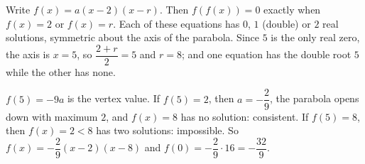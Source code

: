 Write $f(x)=a(x-2)(x-r)$. Then $f(f(x))=0$ exactly when $f(x)=2$ or $f(x)=r$. Each of these equations has $0$, $1$ (double) or $2$ real solutions, symmetric about the axis of the parabola. Since $5$ is the only real zero, the axis is $x=5$, so $\dfrac{2+r}{2}=5$ and $r=8$; and one equation has the double root $5$ while the other has none.

$f(5)=-9a$ is the vertex value. If $f(5)=2$, then $a=-\dfrac{2}{9}$, the parabola opens down with maximum $2$, and $f(x)=8$ has no solution: consistent. If $f(5)=8$, then $f(x)=2<8$ has two solutions: impossible. So $f(x)=-\dfrac{2}{9}(x-2)(x-8)$ and $f(0)=-\dfrac{2}{9}\cdot16=\boxed{-\dfrac{32}{9}}$.

